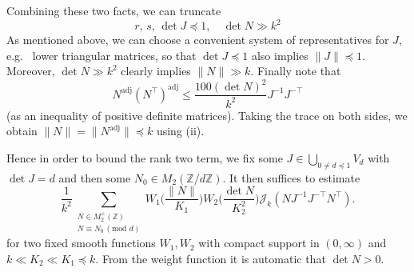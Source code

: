 \documentclass[11pt]{amsart}
\numberwithin{equation}{section}
\theoremstyle{plain}
\theoremstyle{definition}
\numberwithin{equation}{section}
\begin{document}
Combining these two facts, we can truncate
\[ r, \, s, \, \det J  \preccurlyeq 1, \quad \det N \gg k^2\]
As mentioned above, we can choose a convenient system of representatives for $J$, e.g.\ %
lower triangular matrices, 
so that $\det J \preccurlyeq 1$ also implies $\| J \| \preccurlyeq 1$. 
Moreover, $\det N \gg k^2$ clearly implies $\| N \| \gg k$. Finally note that 
\[  N^{\text{adj}} (N^\top)^{\text{adj}} \le \frac{100 (\det N)^2}{k^2} J^{-1}J^{-\top}\]
(as an inequality of positive definite matrices). 
Taking the trace on both sides, we obtain   $\|N \| = \|N^{\mathrm{adj}}\| \preccurlyeq k$ using (ii).  


\medskip

Hence in order to bound the rank two term, we fix some $J \in \bigcup_{0 \not= d \preccurlyeq 1} V_d$ with $\det J = d$ and then some $N_0 \in M_2(\mathbb{Z}/d  \mathbb{Z})$. It then suffices to estimate 
$$ \frac{1}{k^2}  \sum_{\substack{N \in   M_2^+(\mathbb{Z})\\ N \equiv N_0\, (\text{mod } d)}}  W_1\Big(\frac{\| N \|}{K_1}\Big) W_2\Big(\frac{\det N}{K_2^2}\Big)   \mathcal{J}_k( N J^{-1}J^{-\top} N^{\top}). 
$$
for two fixed smooth functions $W_1, W_2$ with compact support in $(0, \infty)$ and $k \ll K_2 \ll K_1 \preccurlyeq k$. From the weight function it is automatic that $\det N > 0$. 
\end{document}
